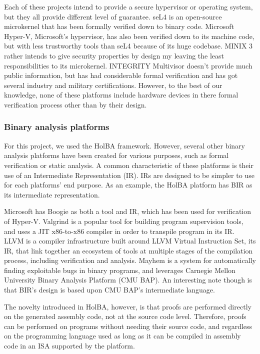 \documentclass[10pt,a4paper]{article}
\begin{document}
\begin{multicols}{2}
Each of these projects intend to provide a secure hypervisor or operating system, but they all provide different level of guarantee. seL4 is an open-source microkernel that has been formally verified down to binary code. Microsoft Hyper-V, Microsoft's hypervisor, has also been verified down to its machine code, but with less trustworthy tools than seL4 because of its huge codebase. MINIX 3 rather intends to give security properties by design my leaving the least responsibilities to its microkernel. INTEGRITY Multivisor doesn't provide much public information, but has had considerable formal verification and has got several industry and military certifications. However, to the best of our knowledge, none of these platforms include hardware devices in there formal verification process other than by their design.

\subsubsection{Binary analysis platforms}

For this project, we used the {HolBA} framework. However, several other binary analysis platforms have been created for various purposes, such as formal verification or static analysis. A common characteristic of these platforms is their use of an Intermediate Representation ({IR}). IRs are designed to be simpler to use for each platforms' end purpose. As an example, the HolBA platform has BIR as its intermediate representation.

Microsoft has Boogie as both a tool and IR, which has been used for verification of Hyper-V. Valgrind is a popular tool for building program supervision tools, and uses a JIT x86-to-x86 compiler in order to transpile program in its IR. LLVM is a compiler infrastructure built around LLVM Virtual Instruction Set, its {IR}, that link together an ecosystem of tools at multiple stages of the compilation process, including verification and analysis. Mayhem is a system for automatically finding exploitable bugs in binary programs, and leverages Carnegie Mellon University Binary Analysis Platform (CMU BAP). An interesting note though is that BIR's design is based upon CMU BAP's intermediate language.

The novelty introduced in HolBA, however, is that proofs are performed directly on the generated assembly code, not at the source code level. Therefore, proofs can be performed on programs without needing their source code, and regardless on the programming language used as long as it can be compiled in assembly code in an {ISA} supported by the platform.


\end{multicols}
\end{document}
